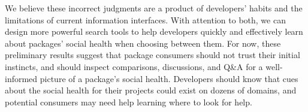 We believe these incorrect judgments are a product of developers' habits and the limitations of current information interfaces.
With attention to both, we can design more powerful search tools to help developers quickly and effectively learn about packages' social health when choosing between them.
For now, these preliminary results suggest that
package consumers should not trust their initial instincts,
and should inspect comparisons, discussions, and Q\&A for a well-informed picture of a package's social health.
Developers should know that cues about the social health for their projects could exist on dozens of domains,
and potential consumers may need help learning where to look for help.
